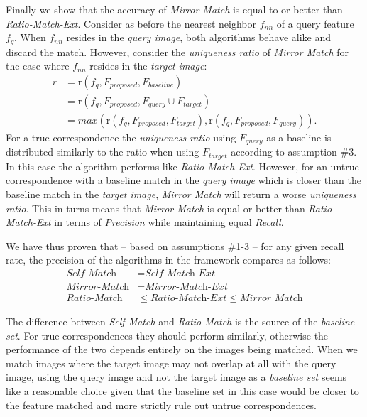 \documentclass[10pt,journal,cspaper,compsoc]{IEEEtran}
\begin{document}
Finally we show that the accuracy of \emph{Mirror-Match} is equal to or better than 
\emph{Ratio-Match-Ext}. Consider as before the nearest neighbor $f_{nn}$ 
of a query feature $f_{q}$. When $f_{nn}$ resides in the \emph{query 
image}, both algorithms behave alike and discard the match.  However, 
consider the \emph{uniqueness ratio} of \emph{Mirror Match} for the case where 
$f_{nn}$ resides in the \emph{target image}:
\begin{align*}
    r &= \text{r}(f_{q}, F_{proposed}, F_{baseline}) \\
        &= \text{r}(f_{q}, F_{proposed}, F_{query} \cup F_{target})\\
        &= max( \text{r}(f_{q}, F_{proposed}, F_{target}), 
    \text{r}(f_{q}, F_{proposed}, F_{query}) ).
\end{align*}
For a true correspondence the \emph{uniqueness ratio} using 
$F_{query}$ as a baseline is distributed similarly to the ratio when using 
$F_{target}$ according to assumption \#3. In this case the algorithm performs like 
\emph{Ratio-Match-Ext}.  However, for an untrue correspondence with a 
baseline match in the \emph{query image} which is closer than the
baseline match in the \emph{target image}, \emph{Mirror Match} will 
return a worse \emph{uniqueness ratio}. This in turns means that \emph{Mirror 
Match} is equal or better than \emph{Ratio-Match-Ext} in terms of  
\emph{Precision} while maintaining equal \emph{Recall}.

We have thus proven that -- based on assumptions \#1-3 -- for any given recall rate, the 
precision of the algorithms in the framework compares as follows:
\begin{align*}
    \textit{Self-Match} &= \textit{Self-Match-Ext} \\
    \textit{Mirror-Match} &= \textit{Mirror-Match-Ext} \\
    \textit{Ratio-Match} &\leq \textit{Ratio-Match-Ext} \leq 
    \textit{Mirror Match}
\end{align*}

The difference between \emph{Self-Match} and \emph{Ratio-Match} is  
the source of the \emph{baseline set}. For true correspondences 
they should perform similarly, otherwise the 
performance of the two depends entirely on the images being matched. 
When we match images where the target image may not overlap at all 
with the query image, using the query image and not the target image as 
a \emph{baseline set} seems like a reasonable choice given that the 
baseline set in this case would be closer to the feature matched and 
more strictly rule out untrue correspondences.
\end{document}

